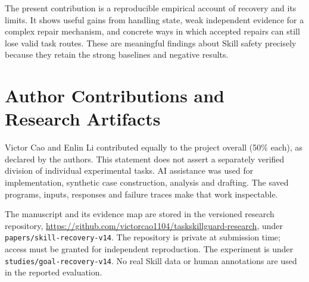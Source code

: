 \documentclass[conference]{IEEEtran}
\begin{document}
The present contribution is a reproducible empirical account of recovery and its limits. It shows useful gains from handling state, weak independent evidence for a complex repair mechanism, and concrete ways in which accepted repairs can still lose valid task routes. These are meaningful findings about Skill safety precisely because they retain the strong baselines and negative results.

\section*{Author Contributions and Research Artifacts}
Victor Cao and Enlin Li contributed equally to the project overall (50\% each), as declared by the authors. This statement does not assert a separately verified division of individual experimental tasks. AI assistance was used for implementation, synthetic case construction, analysis and drafting. The saved programs, inputs, responses and failure traces make that work inspectable.

The manuscript and its evidence map are stored in the versioned research repository, \url{https://github.com/victorcao1104/taskskillguard-research}, under \nolinkurl{papers/skill-recovery-v14}. The repository is private at submission time; access must be granted for independent reproduction. The experiment is under \nolinkurl{studies/goal-recovery-v14}. No real Skill data or human annotations are used in the reported evaluation.
\end{document}
